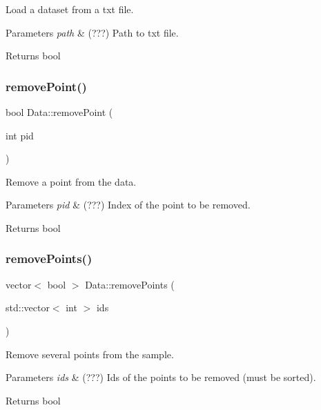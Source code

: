 Load a dataset from a txt file. 


\begin{DoxyParams}{Parameters}
{\em path} & (???) Path to txt file. \\
\hline
\end{DoxyParams}
\begin{DoxyReturn}{Returns}
bool 
\end{DoxyReturn}
\mbox{\label{class_data_ad927494a13a5018ff3644212d7234a03}} 
\subsubsection{\texorpdfstring{remove\+Point()}{removePoint()}}
{\footnotesize\ttfamily bool Data\+::remove\+Point (\begin{DoxyParamCaption}\item[{int}]{pid }\end{DoxyParamCaption})}



Remove a point from the data. 


\begin{DoxyParams}{Parameters}
{\em pid} & (???) Index of the point to be removed. \\
\hline
\end{DoxyParams}
\begin{DoxyReturn}{Returns}
bool 
\end{DoxyReturn}
\mbox{\label{class_data_a6cc376e614e5440061c66833e1c8d30a}} 
\subsubsection{\texorpdfstring{remove\+Points()}{removePoints()}}
{\footnotesize\ttfamily vector$<$ bool $>$ Data\+::remove\+Points (\begin{DoxyParamCaption}\item[{std\+::vector$<$ int $>$}]{ids }\end{DoxyParamCaption})}



Remove several points from the sample. 


\begin{DoxyParams}{Parameters}
{\em ids} & (???) Ids of the points to be removed (must be sorted). \\
\hline
\end{DoxyParams}
\begin{DoxyReturn}{Returns}
bool 
\end{DoxyReturn}


